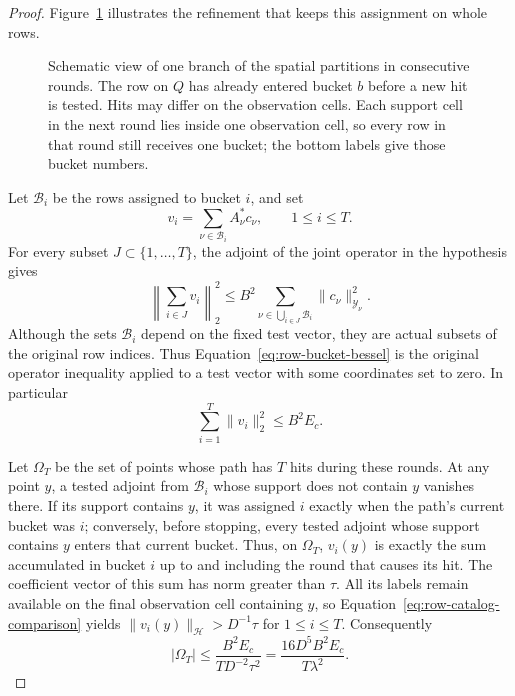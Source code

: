\begin{proof}
Figure~\ref{fig:row-chronology} illustrates the refinement that keeps this
assignment on whole rows.
\begin{figure}[ht]
\centering

\caption{Schematic view of one branch of the spatial partitions in consecutive
rounds.  The row on $Q$ has already entered bucket $b$ before a new hit is tested.
Hits may differ on the observation cells.  Each support cell in the next
round lies inside one observation cell, so every row in that round still
receives one bucket; the bottom labels give those bucket numbers.}
\label{fig:row-chronology}
\end{figure}

Let $\mathcal B_i$ be the rows assigned to bucket $i$, and set
\[
 v_i=\sum_{\nu\in\mathcal B_i} A_\nu^*c_\nu,\qquad 1\le i\le T.
\]
For every subset $J\subset\{1,\ldots,T\}$, the adjoint of the
joint operator in the hypothesis gives
\begin{equation}
 \left\|\sum_{i\in J}v_i\right\|_2^2
 \le B^2\sum_{\nu\in\bigcup_{i\in J}\mathcal B_i}
                   \|c_\nu\|_{\mathcal Y_\nu}^2.
 \label{eq:row-bucket-bessel}
\end{equation}
Although the sets $\mathcal B_i$ depend on the fixed test vector,
they are actual subsets of the original row indices.  Thus
Equation~\eqref{eq:row-bucket-bessel} is the original operator
inequality applied to a test vector with some coordinates set to
zero.  In particular
\[
 \sum_{i=1}^T\|v_i\|_2^2\le B^2E_c.
\]

Let $\Omega_T$ be the set of points whose path has $T$ hits during
these rounds.  At any point $y$, a tested adjoint from $\mathcal B_i$
whose support does not contain $y$ vanishes there.  If its support
contains $y$, it was assigned $i$ exactly when the path's current
bucket was $i$; conversely, before stopping, every tested adjoint
whose support contains $y$ enters that current bucket.
Thus, on $\Omega_T$, $v_i(y)$ is exactly the sum accumulated in
bucket $i$ up to and including the round that causes its hit.
The coefficient vector of this sum has norm greater than $\tau$.  All its labels remain
available on the final observation cell containing $y$, so
Equation~\eqref{eq:row-catalog-comparison} yields
$\|v_i(y)\|_{\mathcal H}>D^{-1}\tau$ for $1\le i\le T$.
Consequently
\begin{equation}
 |\Omega_T|
 \le \frac{B^2E_c}{TD^{-2}\tau^2}
 =\frac{16D^5B^2E_c}{T\lambda^2}.
 \label{eq:row-many-hits}
\end{equation}


\end{proof}
